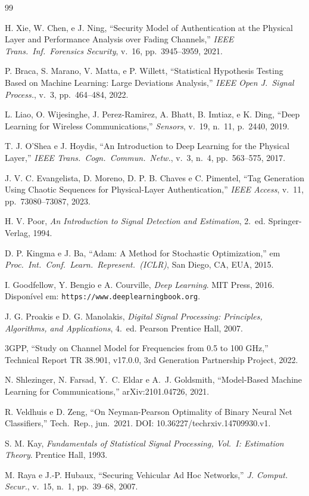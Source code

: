 \documentclass{sbrt}
\begin{document}
\begin{thebibliography}{99}

 H. Xie, W. Chen, e J. Ning, ``Security Model of Authentication at the Physical Layer and Performance Analysis over Fading Channels,'' \textit{IEEE Trans.\ Inf.\ Forensics Security}, v.~16, pp.~3945--3959, 2021.

 P. Braca, S. Marano, V. Matta, e P. Willett, ``Statistical Hypothesis Testing Based on Machine Learning: Large Deviations Analysis,'' \textit{IEEE Open J.\ Signal Process.}, v.~3, pp.~464--484, 2022.

 L. Liao, O. Wijesinghe, J. Perez-Ramirez, A. Bhatt, B. Imtiaz, e K. Ding, ``Deep Learning for Wireless Communications,'' \textit{Sensors}, v.~19, n.~11, p.~2440, 2019.

 T. J. O'Shea e J. Hoydis, ``An Introduction to Deep Learning for the Physical Layer,'' \textit{IEEE Trans.\ Cogn.\ Commun.\ Netw.}, v.~3, n.~4, pp.~563--575, 2017.

 J. V. C. Evangelista, D. Moreno, D. P. B. Chaves e C. Pimentel, ``Tag Generation Using Chaotic Sequences for Physical-Layer Authentication,'' \textit{IEEE Access}, v.~11, pp.~73080--73087, 2023.

 H. V. Poor, \textit{An Introduction to Signal Detection and Estimation}, 2.~ed. Springer-Verlag, 1994.

 D. P. Kingma e J. Ba, ``Adam: A Method for Stochastic Optimization,'' em \textit{Proc.\ Int.\ Conf.\ Learn.\ Represent.\ (ICLR)}, San Diego, CA, EUA, 2015.

 I. Goodfellow, Y. Bengio e A. Courville, \textit{Deep Learning}. MIT Press, 2016. Disponível em: \texttt{https://www.deeplearningbook.org}.

 J. G. Proakis e D. G. Manolakis, \textit{Digital Signal Processing: Principles, Algorithms, and Applications}, 4.~ed. Pearson Prentice Hall, 2007.

 3GPP, ``Study on Channel Model for Frequencies from 0.5 to 100 GHz,'' Technical Report TR 38.901, v17.0.0, 3rd Generation Partnership Project, 2022.

 N. Shlezinger, N. Farsad, Y.~C. Eldar e A.~J. Goldsmith, ``Model-Based Machine Learning for Communications,'' arXiv:2101.04726, 2021.

 R. Veldhuis e D. Zeng, ``On Neyman-Pearson Optimality of Binary Neural Net Classifiers,'' Tech.\ Rep., jun.\ 2021. DOI: 10.36227/techrxiv.14709930.v1.

 S. M. Kay, \textit{Fundamentals of Statistical Signal Processing, Vol.~I: Estimation Theory}. Prentice Hall, 1993.

 M. Raya e J.-P. Hubaux, ``Securing Vehicular Ad Hoc Networks,'' \textit{J. Comput. Secur.}, v.~15, n.~1, pp.~39--68, 2007.

\end{thebibliography}
\end{document}
